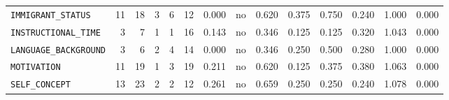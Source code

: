 \begin{table}[htbp]
{\begin{tabular}{lrrrrrrcrrrrrr}
\texttt{IMMIGRANT\_STATUS} & 11 & 18 & 3 & 6 & 12 & 0.000 & no & 0.620 & 0.375 & 0.750 & 0.240 & 1.000 & 0.000 \\
\texttt{INSTRUCTIONAL\_TIME} & 3 & 7 & 1 & 1 & 16 & 0.143 & no & 0.346 & 0.125 & 0.125 & 0.320 & 1.043 & 0.000 \\
\texttt{LANGUAGE\_BACKGROUND} & 3 & 6 & 2 & 4 & 14 & 0.000 & no & 0.346 & 0.250 & 0.500 & 0.280 & 1.000 & 0.000 \\
\texttt{MOTIVATION} & 11 & 19 & 1 & 3 & 19 & 0.211 & no & 0.620 & 0.125 & 0.375 & 0.380 & 1.063 & 0.000 \\
\texttt{SELF\_CONCEPT} & 13 & 23 & 2 & 2 & 12 & 0.261 & no & 0.659 & 0.250 & 0.250 & 0.240 & 1.078 & 0.000 \\
\bottomrule
\end{tabular}}
\par{}
\end{table}
